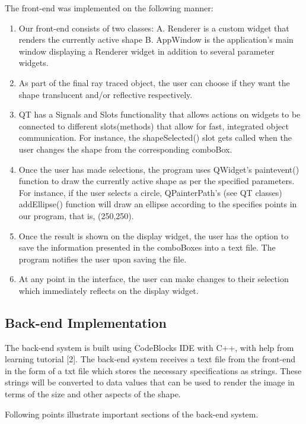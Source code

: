 \documentclass{article}
\begin{document}
 The front-end was implemented on the following manner: 
 \begin{enumerate}
     \item	Our front-end consists of two classes:
A. Renderer is a custom widget that renders the currently active shape
B. AppWindow is the application’s main window displaying a Renderer widget in addition to several parameter widgets.

\item	As part of the final ray traced object, the user can choose if they want the shape translucent and/or reflective respectively. 
\item	QT has a Signals and Slots functionality that allows actions on widgets to be connected to different slots(methods) that allow for fast, integrated object communication. For instance, the shapeSelected() slot gets called when the user changes the shape from the corresponding comboBox.
\item	Once the user has made selections, the program uses QWidget’s paintevent() function to draw the currently active shape as per the specified parameters. For instance, if the user selects a circle, QPainterPath’s (see QT classes) addEllipse() function will draw an ellipse according to the specifies points in our program, that is, (250,250).
\item	Once the result is shown on the display widget, the user has the option to save the information presented in the comboBoxes into a text file. The program notifies the user upon saving the file.
\item	At any point in the interface, the user can make changes to their selection which immediately reflects on the display widget. 

 \end{enumerate}
 
 
\subsection{Back-end Implementation}
The back-end system is built using CodeBlocks IDE with C++, with help from learning tutorial [2]. The back-end system receives a text file from the front-end in the form of a txt file which stores the necessary  specifications as strings. These strings will be converted to data values that can be used to render the image in terms of the size and other aspects of the shape.  

Following points illustrate important sections of the back-end system.
\end{document}
